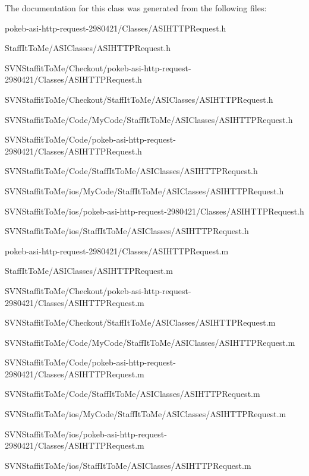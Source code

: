 \-The documentation for this class was generated from the following files\-:\begin{DoxyCompactItemize}
\item 
pokeb-\/asi-\/http-\/request-\/2980421/\-Classes/\-A\-S\-I\-H\-T\-T\-P\-Request.\-h\item 
\-Staff\-It\-To\-Me/\-A\-S\-I\-Classes/\-A\-S\-I\-H\-T\-T\-P\-Request.\-h\item 
\-S\-V\-N\-Staffit\-To\-Me/\-Checkout/pokeb-\/asi-\/http-\/request-\/2980421/\-Classes/\-A\-S\-I\-H\-T\-T\-P\-Request.\-h\item 
\-S\-V\-N\-Staffit\-To\-Me/\-Checkout/\-Staff\-It\-To\-Me/\-A\-S\-I\-Classes/\-A\-S\-I\-H\-T\-T\-P\-Request.\-h\item 
\-S\-V\-N\-Staffit\-To\-Me/\-Code/\-My\-Code/\-Staff\-It\-To\-Me/\-A\-S\-I\-Classes/\-A\-S\-I\-H\-T\-T\-P\-Request.\-h\item 
\-S\-V\-N\-Staffit\-To\-Me/\-Code/pokeb-\/asi-\/http-\/request-\/2980421/\-Classes/\-A\-S\-I\-H\-T\-T\-P\-Request.\-h\item 
\-S\-V\-N\-Staffit\-To\-Me/\-Code/\-Staff\-It\-To\-Me/\-A\-S\-I\-Classes/\-A\-S\-I\-H\-T\-T\-P\-Request.\-h\item 
\-S\-V\-N\-Staffit\-To\-Me/ios/\-My\-Code/\-Staff\-It\-To\-Me/\-A\-S\-I\-Classes/\-A\-S\-I\-H\-T\-T\-P\-Request.\-h\item 
\-S\-V\-N\-Staffit\-To\-Me/ios/pokeb-\/asi-\/http-\/request-\/2980421/\-Classes/\-A\-S\-I\-H\-T\-T\-P\-Request.\-h\item 
\-S\-V\-N\-Staffit\-To\-Me/ios/\-Staff\-It\-To\-Me/\-A\-S\-I\-Classes/\-A\-S\-I\-H\-T\-T\-P\-Request.\-h\item 
pokeb-\/asi-\/http-\/request-\/2980421/\-Classes/\-A\-S\-I\-H\-T\-T\-P\-Request.\-m\item 
\-Staff\-It\-To\-Me/\-A\-S\-I\-Classes/\-A\-S\-I\-H\-T\-T\-P\-Request.\-m\item 
\-S\-V\-N\-Staffit\-To\-Me/\-Checkout/pokeb-\/asi-\/http-\/request-\/2980421/\-Classes/\-A\-S\-I\-H\-T\-T\-P\-Request.\-m\item 
\-S\-V\-N\-Staffit\-To\-Me/\-Checkout/\-Staff\-It\-To\-Me/\-A\-S\-I\-Classes/\-A\-S\-I\-H\-T\-T\-P\-Request.\-m\item 
\-S\-V\-N\-Staffit\-To\-Me/\-Code/\-My\-Code/\-Staff\-It\-To\-Me/\-A\-S\-I\-Classes/\-A\-S\-I\-H\-T\-T\-P\-Request.\-m\item 
\-S\-V\-N\-Staffit\-To\-Me/\-Code/pokeb-\/asi-\/http-\/request-\/2980421/\-Classes/\-A\-S\-I\-H\-T\-T\-P\-Request.\-m\item 
\-S\-V\-N\-Staffit\-To\-Me/\-Code/\-Staff\-It\-To\-Me/\-A\-S\-I\-Classes/\-A\-S\-I\-H\-T\-T\-P\-Request.\-m\item 
\-S\-V\-N\-Staffit\-To\-Me/ios/\-My\-Code/\-Staff\-It\-To\-Me/\-A\-S\-I\-Classes/\-A\-S\-I\-H\-T\-T\-P\-Request.\-m\item 
\-S\-V\-N\-Staffit\-To\-Me/ios/pokeb-\/asi-\/http-\/request-\/2980421/\-Classes/\-A\-S\-I\-H\-T\-T\-P\-Request.\-m\item 
\-S\-V\-N\-Staffit\-To\-Me/ios/\-Staff\-It\-To\-Me/\-A\-S\-I\-Classes/\-A\-S\-I\-H\-T\-T\-P\-Request.\-m\end{DoxyCompactItemize}
